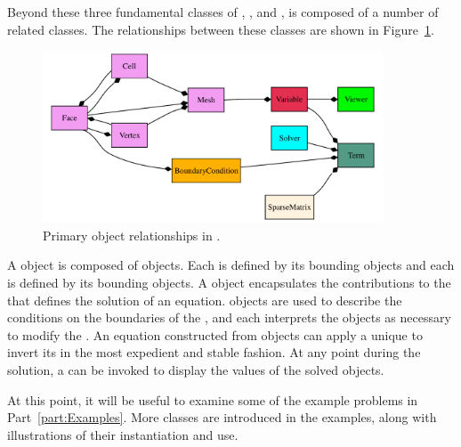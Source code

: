 Beyond these three fundamental classes of , 
, and , \FiPy{} is composed of a
number of related classes. The relationships between these classes are shown in
Figure~\ref{fig:objects}. 
\begin{figure}[tbp]
    \centering
    \includegraphics[width=0.9\textwidth]{objects}
    \caption{Primary object relationships in \FiPy{}.}
    \label{fig:objects}
\end{figure}
A  object is composed of  objects.  Each
 is defined by its bounding  objects and each
 is defined by its bounding  objects.  A
 object encapsulates the contributions to the
 that defines the solution of an equation.
 objects are used to describe the conditions
on the boundaries of the , and each 
interprets the  objects as necessary to
modify the .  An equation constructed from
 objects can apply a unique  to invert its
 in the most expedient and stable fashion.  At any
point during the solution, a  can be invoked to display
the values of the solved  objects.

At this point, it will be useful to examine some of the example
problems in Part~\ref{part:Examples}.  More classes are introduced in
the examples, along with illustrations of their instantiation and use.


